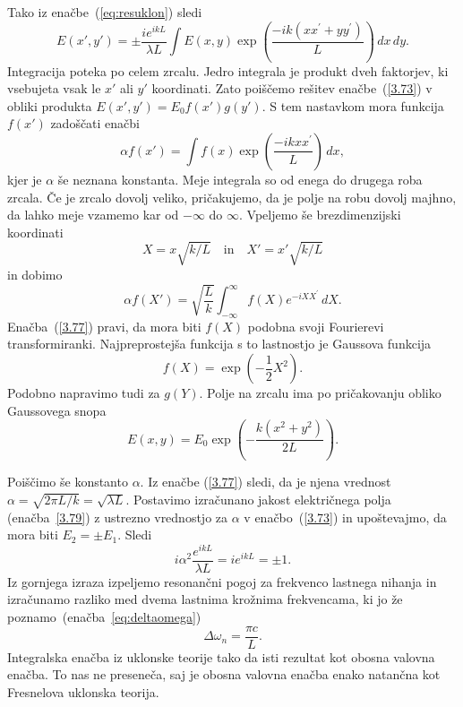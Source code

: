 Tako iz enačbe~(\ref{eq:resuklon}) sledi
\begin{equation}
E(x',y')=\pm\frac{ie^{ikL}}{\lambda L}\int E(x,y)\exp
\left(\frac{-ik(xx^{\prime}+yy^{\prime})}{L}\right)\, dx\, dy.
\label{3.73}
\end{equation}
Integracija poteka po celem zrcalu. Jedro integrala je produkt dveh
faktorjev, ki vsebujeta vsak le $x'$ ali $y'$ koordinati. Zato poiščemo
rešitev enačbe~(\ref{3.73}) v obliki produkta 
$E(x',y')=E_{0}f(x')g(y')$.
S tem nastavkom mora funkcija $f(x')$ zadoščati enačbi
\begin{equation}
\alpha f(x')=\int f(x)\exp\left(\frac{-ikxx^{\prime}}{L}\right)\, dx,
\label{3.75}
\end{equation}
kjer je $\alpha$ še neznana konstanta. Meje integrala so od enega do 
drugega roba zrcala. Če je zrcalo dovolj veliko,
pričakujemo, da je polje na robu dovolj majhno, da lahko meje vzamemo
kar od $-\infty$ do $\infty$. Vpeljemo še brezdimenzijski koordinati
\begin{equation}
X=x\sqrt{k/L} \quad \mathrm{in} \quad X'=x'\sqrt{k/L}
\label{3.76}
\end{equation}
in dobimo
\begin{equation}
\alpha f(X')=\sqrt{\frac{L}{k}}\int_{-\infty}^{\infty}f(X)e^{-iXX^{\prime}}\, dX.
\label{3.77}
\end{equation}
Enačba~(\ref{3.77}) pravi, da mora
biti $f(X)$ podobna svoji Fourierevi transformiranki. Najpreprostejša
funkcija s to lastnostjo je Gaussova funkcija 
\begin{equation}
f(X)=\exp\left(-\frac{1}{2}X^{2}\right).
\label{3.78}
\end{equation}
Podobno napravimo tudi za $g(Y)$. Polje na zrcalu ima po pričakovanju obliko Gaussovega snopa
\begin{equation}
E(x,y)=E_{0}\exp\left(-\frac{k(x^{2}+y^{2})}{2L}\right).
\label{3.79}
\end{equation}

Poiščimo še konstanto $\alpha$. Iz enačbe (\ref{3.77}) sledi, da je njena vrednost 
$\alpha = \sqrt{2\pi L/k}=\sqrt{\lambda L}$. Postavimo izračunano jakost električnega
polja (enačba~\ref{3.79}) z ustrezno vrednostjo za $\alpha$ v 
enačbo~(\ref{3.73}) in upoštevajmo, da mora biti
$E_{2}=\pm E_{1}$. Sledi
\begin{equation}
i\alpha^{2}\frac{e^{ikL}}{\lambda L}=ie^{ikL}=\pm1.
\label{3.80}
\end{equation}
Iz gornjega izraza izpeljemo resonančni pogoj za frekvenco lastnega nihanja 
in izračunamo razliko med dvema lastnima krožnima frekvencama, 
ki jo že poznamo~(enačba~\ref{eq:deltaomega})
\begin{equation}
\Delta \omega_n=\frac{\pi c}{L}.
\label{3.81}
\end{equation}
Integralska enačba iz uklonske teorije tako da
isti rezultat kot obosna valovna enačba. To nas ne preseneča, saj je
obosna valovna enačba enako natančna kot Fresnelova uklonska teorija.

